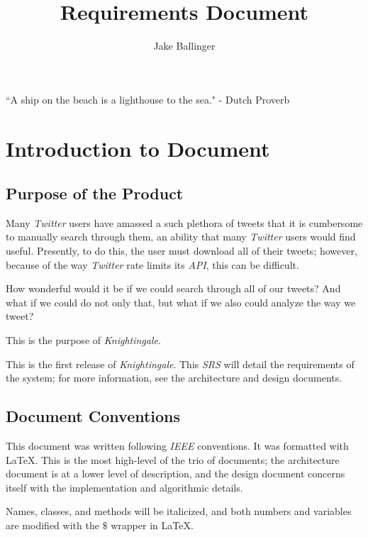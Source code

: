 \documentclass[a4paper, 12pt]{article}
\title{Requirements Document}
\author{Jake Ballinger}
\begin{document}
\maketitle

\begin{center}
\centering ``A ship on the beach is a lighthouse to the sea." \newline
\centering - Dutch Proverb
\end{center}

\section{Introduction to Document} \label{sec:intro}
\subsection{Purpose of the Product} \label{sec:purpose}
\begin{adjustwidth}{2em}{0pt}
Many \textit{Twitter} users have amassed a such plethora of tweets that it is cumbersome to manually search through them, an ability that many \textit{Twitter} users would find useful. Presently, to do this, the user must download all of their tweets; however, because of the way \textit{Twitter} rate limits its \textit{API}, this can be difficult. \newline

\noindent How wonderful would it be if we could search through all of our tweets? And what if we could do not only that, but what if we also could analyze the way we tweet?\newline

\noindent This is the purpose of \textit{Knightingale}. \newline

\noindent This is the first release of \textit{Knightingale}. This \textit{SRS} will detail the requirements of the system; for more information, see the architecture and design documents.
\end{adjustwidth}

\subsection{Document Conventions} \label{sec:conventions}
\begin{adjustwidth}{2em}{0pt}
This document was written following \textit{IEEE} conventions. It was formatted with \LaTeX. This is the most high-level of the trio of documents; the architecture document is at a lower level of description, and the design document concerns itself with the implementation and algorithmic details. \newline

\noindent Names, classes, and methods will be italicized, and both numbers and variables are modified with the $\$$ wrapper in \LaTeX.
\end{adjustwidth}
\end{document}

